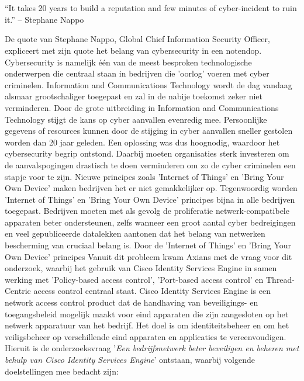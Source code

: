 
\chapter{}
\label{ch:inleiding}

\begin{displayquote}
	“It takes 20 years to build a reputation and few minutes of cyber-incident to ruin it.” – Stephane Nappo
\end{displayquote}

De quote van Stephane Nappo, Global Chief Information Security Officer, expliceert met zijn quote het belang van cybersecurity in een notendop. Cybersecurity is namelijk één van de meest besproken technologische onderwerpen die centraal staan in bedrijven die 'oorlog' voeren met cyber criminelen. Information and Communications Technology wordt de dag vandaag alsmaar grootschaliger toegepast en zal in de nabije toekomst zeker niet verminderen. Door de grote uitbreiding in Information and Communications Technology stijgt de kans op cyber aanvallen evenredig mee. Persoonlijke gegevens of resources kunnen door de stijging in cyber aanvallen sneller gestolen worden dan 20 jaar geleden. Een oplossing was dus hoognodig, waardoor het cybersecurity begrip ontstond. 
\newline
\newline
Daarbij moeten organisaties sterk investeren om de aanvalspogingen drastisch te doen verminderen om zo de cyber criminelen een stapje voor te zijn. Nieuwe principes zoals 'Internet of Things' en 'Bring Your Own Device' maken bedrijven het er niet gemakkelijker op. Tegenwoordig worden 'Internet of Things' en 'Bring Your Own Device' principes bijna in alle bedrijven toegepast. Bedrijven moeten met als gevolg de proliferatie netwerk-compatibele apparaten beter ondersteunen, zelfs wanneer een groot aantal cyber bedreigingen en veel gepubliceerde datalekken aantonen dat het belang van netwerken bescherming van cruciaal belang is. 
\newline
\newline
Door de 'Internet of Things' en 'Bring Your Own Device' principes 
Vanuit dit probleem kwam Axians met de vraag voor dit onderzoek, waarbij het gebruik van Cisco Identity Services Engine in samen werking met 'Policy-based access control', 'Port-based access control' en Thread-Centric access control centraal staat. Cisco Identity Services Engine is een network access control product dat de handhaving van beveiligings- en toegangsbeleid mogelijk maakt voor eind apparaten die zijn aangesloten op het netwerk apparatuur van het bedrijf. Het doel is om identiteitsbeheer en om het veiligsbeheer op verschillende eind apparaten en applicaties te vereenvoudigen.
\newline
\newline
Hieruit is de onderzoeksvraag '\textit{Een bedrijfsnetwerk beter beveiligen en beheren met behulp van Cisco Identity Services Engine}' ontstaan, waarbij volgende doelstellingen mee bedacht zijn: 

